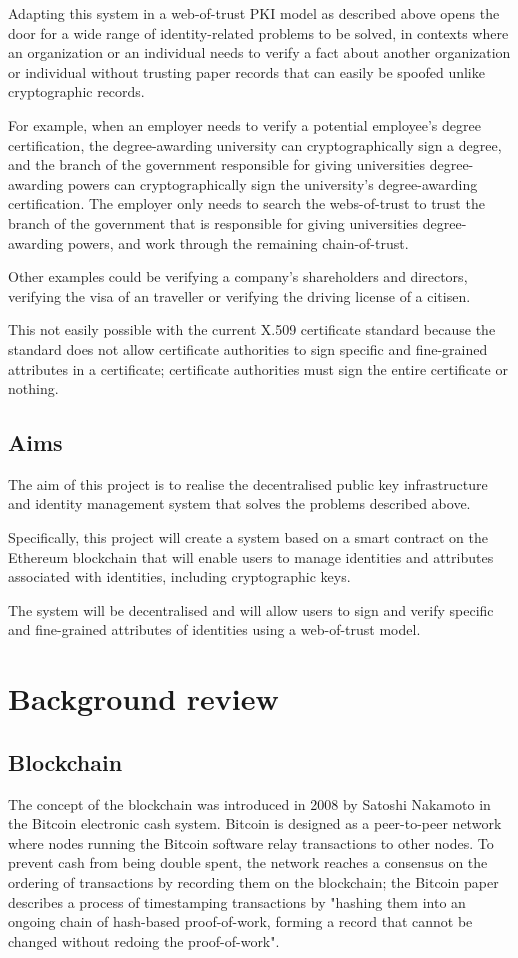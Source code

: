 \documentclass[12pt]{report}
\begin{document}
	Adapting this system in a web-of-trust PKI model as described above opens the door for a wide range of identity-related problems to be solved, in contexts where an organization or an individual needs to verify a fact about another organization or individual without trusting paper records that can easily be spoofed unlike cryptographic records.
	
	For example, when an employer needs to verify a potential employee's degree certification, the degree-awarding university can cryptographically sign a degree, and the branch of the government responsible for giving universities degree-awarding powers can cryptographically sign the university's degree-awarding certification. The employer only needs to search the webs-of-trust to trust the branch of the government that is responsible for giving universities degree-awarding powers, and work through the remaining chain-of-trust.
	
	Other examples could be verifying a company's shareholders and directors, verifying the visa of an traveller or verifying the driving license of a citisen.
	
	This not easily possible with the current X.509 certificate standard because the standard does not allow certificate authorities to sign specific and fine-grained attributes in a certificate; certificate authorities must sign the entire certificate or nothing.
	
	
	\section{Aims}
	The aim of this project is to realise the decentralised public key infrastructure and identity management system that solves the problems described above.
	
	Specifically, this project will create a system based on a smart contract on the Ethereum blockchain that will enable users to manage identities and attributes associated with identities, including cryptographic keys.
	
	The system will be decentralised and will allow users to sign and verify specific and fine-grained attributes of identities using a web-of-trust model.
	
	\chapter{Background review}
	\section{Blockchain}
	The	concept of the blockchain was introduced in 2008 by Satoshi Nakamoto in the Bitcoin electronic cash system.\cite{9} Bitcoin is designed as a peer-to-peer network where nodes running the Bitcoin software relay transactions to other nodes. To prevent cash from being double spent, the network reaches a consensus on the ordering of transactions by recording them on the blockchain; the Bitcoin paper describes a process of timestamping transactions by "hashing them into an ongoing chain of hash-based proof-of-work, forming a record that cannot be changed without redoing the proof-of-work".
	
\end{document}
